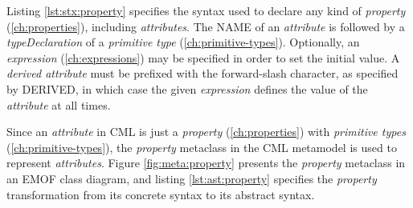 Listing \ref{lst:stx:property} specifies the syntax used
to declare any kind of \emph{property} (\ref{ch:properties}),
including \emph{attributes}.
The NAME of an \emph{attribute} is followed
by a \emph{typeDeclaration} of a \emph{primitive type}
(\ref{ch:primitive-types}).
Optionally, an \emph{expression} (\ref{ch:expressions}) may be specified
in order to set the initial value.
A \emph{derived attribute} must be prefixed with the forward-slash character,
as specified by DERIVED,
in which case the given \emph{expression} defines the value
of the \emph{attribute} at all times.

Since an \emph{attribute} in CML is just a \emph{property} (\ref{ch:properties})
with \emph{primitive types} (\ref{ch:primitive-types}),
the \emph{property} metaclass in the CML metamodel is used to represent
\emph{attributes}.
Figure \ref{fig:meta:property} presents the \emph{property} metaclass
in an EMOF \cite{mof} class diagram,
and listing \ref{lst:ast:property} specifies
the \emph{property} transformation
from its concrete syntax to its abstract syntax.
